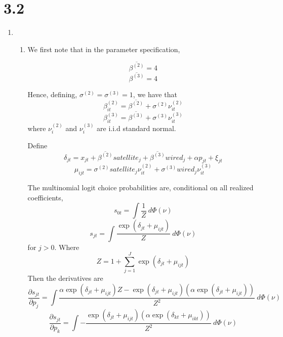 \documentclass[10pt,letter]{article}
\begin{document}
\section*{3.2}
\begin{enumerate}[label=(\alph*)]
\item \begin{enumerate}[label=(\roman*)]
\item We first note that in the parameter specification,

\[ \overline{\beta^{(2)}} = 4 \]
\[ \overline{\beta^{(3)}} = 4 \]

Hence, defining, $\sigma^{(2)} = \sigma^{(3)} = 1$, we have that
\[ \beta_{it}^{(2)} = \overline{\beta^{(2)}} + \sigma^{(2)} \nu_{it}^{(2)}  \]
\[ \beta_{it}^{(3)} = \overline{\beta^{(3)}} + \sigma^{(3)} \nu_{it}^{(3)}  \]
where $\nu^{(2)}_i$ and $\nu^{(3)}_i$ are i.i.d standard normal.

Define
\[ \delta_{jt} = x_{jt} + \overline{\beta^{(2)}}satellite_j +\overline{\beta^{(3)}}wired_j + \alpha p_{jt} + \xi_{jt} \]
\[ \mu_{ijt} = \sigma^{(2)}satellite_j \nu_{it}^{(2)}  + \sigma^{(3)}wired_j \nu_{it}^{(3)}  \]

The multinomial logit choice probabilities are, conditional on all realized coefficients,
\[ s_{0t} = \int \frac{1}{Z} \ d\Phi(\nu) \]
\[ s_{jt} = \int\frac{\exp(\delta_{jt} + \mu_{ijt})}{Z} \ d\Phi(\nu)  \]
for $j > 0$. Where
\[ Z = 1 + \sum_{j=1}^J \exp(\delta_{jt} + \mu_{ijt}) \]
Then the derivatives are
\[ \frac{\partial s_{jt}}{\partial p_j} = \int\frac{\alpha \exp(\delta_{jt} + \mu_{ijt}) Z - \exp(\delta_{jt} + \mu_{ijt})\left(\alpha\exp(\delta_{jt} + \mu_{ijt})\right)}{Z^2} \ d\Phi(\nu)  \]
\[ \frac{\partial s_{jt}}{\partial p_k} = \int-\frac{\exp(\delta_{jt} + \mu_{ijt})\left(\alpha\exp(\delta_{kt} + \mu_{ikt})\right)}{Z^2} \ d\Phi(\nu)  \]



\end{enumerate}
\end{enumerate}
\end{document}
